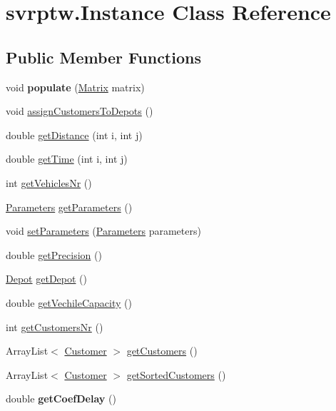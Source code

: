 \hypertarget{classsvrptw_1_1_instance}{}\section{svrptw.\+Instance Class Reference}
\label{classsvrptw_1_1_instance}
\subsection*{Public Member Functions}
\begin{DoxyCompactItemize}
\item 
void {\bfseries populate} (\hyperlink{classheneticmethod_1_1_matrix}{Matrix} matrix)\hypertarget{classsvrptw_1_1_instance_a76518bd5444b75ccbdce39eec3129ad1}{}\label{classsvrptw_1_1_instance_a76518bd5444b75ccbdce39eec3129ad1}

\item 
void \hyperlink{classsvrptw_1_1_instance_a3bbb52b5a2157337a90d5e2e5a99c4cf}{assign\+Customers\+To\+Depots} ()
\item 
double \hyperlink{classsvrptw_1_1_instance_a9d5fd1fb7a49af61fb65d3c747b6900b}{get\+Distance} (int i, int j)
\item 
double \hyperlink{classsvrptw_1_1_instance_a9a6d18df4acdf3d393fc94614535fb2f}{get\+Time} (int i, int j)
\item 
int \hyperlink{classsvrptw_1_1_instance_a3438c93fa4f6919f46b0bd929eff3726}{get\+Vehicles\+Nr} ()
\item 
\hyperlink{classsvrptw_1_1_parameters}{Parameters} \hyperlink{classsvrptw_1_1_instance_ae2aef824676a1983e99b485088785dc7}{get\+Parameters} ()
\item 
void \hyperlink{classsvrptw_1_1_instance_a0d4cd2da35b4a0e20d0a0b472b064dcb}{set\+Parameters} (\hyperlink{classsvrptw_1_1_parameters}{Parameters} parameters)
\item 
double \hyperlink{classsvrptw_1_1_instance_a44a0f152371f3930cfd99771d301c726}{get\+Precision} ()
\item 
\hyperlink{classsvrptw_1_1_depot}{Depot} \hyperlink{classsvrptw_1_1_instance_a0f16b167d51d1b0cee983115b592e03d}{get\+Depot} ()
\item 
double \hyperlink{classsvrptw_1_1_instance_a9e6b360e2b401f032c47dc5b85c01c56}{get\+Vechile\+Capacity} ()
\item 
int \hyperlink{classsvrptw_1_1_instance_ae2a5c22003021c5de82ff45c52cc8653}{get\+Customers\+Nr} ()
\item 
Array\+List$<$ \hyperlink{classsvrptw_1_1_customer}{Customer} $>$ \hyperlink{classsvrptw_1_1_instance_a4a8c0bfdfb4fbfface8d94a855f9bb31}{get\+Customers} ()
\item 
Array\+List$<$ \hyperlink{classsvrptw_1_1_customer}{Customer} $>$ \hyperlink{classsvrptw_1_1_instance_ae67f5f1869cceeb523f8d75ed9cdce5d}{get\+Sorted\+Customers} ()
\item 
double {\bfseries get\+Coef\+Delay} ()\hypertarget{classsvrptw_1_1_instance_a119074b7f1cfc8f907b003c5e13619f6}{}\label{classsvrptw_1_1_instance_a119074b7f1cfc8f907b003c5e13619f6}


\end{DoxyCompactItemize}
